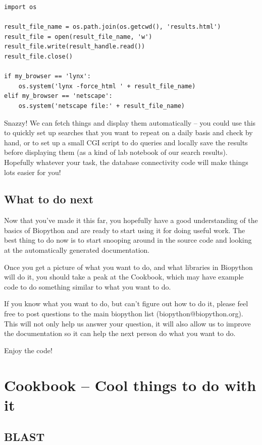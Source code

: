 \documentclass{report}
\begin{document}
\begin{verbatim}
import os

result_file_name = os.path.join(os.getcwd(), 'results.html')
result_file = open(result_file_name, 'w')
result_file.write(result_handle.read())
result_file.close()

if my_browser == 'lynx':
    os.system('lynx -force_html ' + result_file_name)
elif my_browser == 'netscape':
    os.system('netscape file:' + result_file_name)
\end{verbatim}

Snazzy! We can fetch things and display them automatically -- you could use this to quickly set up searches that you want to repeat on a daily basis and check by hand, or to set up a small CGI script to do queries and locally save the results before displaying them (as a kind of lab notebook of our search results). Hopefully whatever your task, the database connectivity code will make things lots easier for you!

\section{What to do next}

Now that you've made it this far, you hopefully have a good understanding of the basics of Biopython and are ready to start using it for doing useful work. The best thing to do now is to start snooping around in the source code and looking at the automatically generated documentation. 


Once you get a picture of what you want to do, and what libraries in Biopython will do it, you should take a peak at the Cookbook, which may have example code to do something similar to what you want to do. 


If you know what you want to do, but can't figure out how to do it, please feel free to post questions to the main biopython list (biopython@biopython.org). This will not only help us answer your question, it will also allow us to improve the documentation so it can help the next person do what you want to do.


Enjoy the code!

\chapter{Cookbook -- Cool things to do with it}
\label{sec:cookbook}

\section{BLAST}
\end{document}
